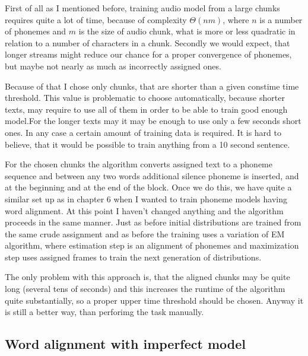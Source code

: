 \documentclass[12pt,a4paper,english]{article}
\begin{document}
First of all as I mentioned before, training audio model from a large chunks requires quite a lot of time, because of complexity $\Theta(nm)$, where $n$ is a number of phonemes and $m$ is the size of audio chunk, what is more or less quadratic in relation to a number of characters in a chunk. \newline
Secondly we would expect, that longer streams might reduce our chance for a proper convergence of phonemes, but maybe not nearly as much as incorrectly assigned ones. \newline

Because of that I chose only chunks, that are shorter than a given constime time threshold. This value is problematic to choose automatically, because shorter texts, may require to use all of them in order to be able to train good enough model.For the longer texts may it may be enough to use only a few seconds short ones.
In any case a certain amount of training data is required. It is hard to believe, that it would be possible to train anything from a 10 second sentence. \newline

For the chosen chunks the algorithm converts assigned text to a phoneme sequence and between any two words additional silence phoneme is inserted, and at the beginning and at the end of the block. \newline
Once we do this, we have quite a similar set up as in chapter 6 when I wanted to train phoneme models having word alignment. At this point I haven't changed anything and the algorithm proceeds in the same manner. \newline
Just as before initial distributions are trained from the same crude assignment and as before the training uses a variation of EM algorithm, where estimation step is an alignment of phonemes and maximization step uses assigned frames to train the next generation of distributions. \newline

The only problem with this approach is, that the aligned chunks may be quite long (several tens of seconds) and this increases the runtime of the algorithm quite substantially, so a proper upper time threshold should be chosen. Anyway it is still a better way, than perforimg the task manually.


\newpage
\subsection{Word alignment with imperfect model}
\end{document}
